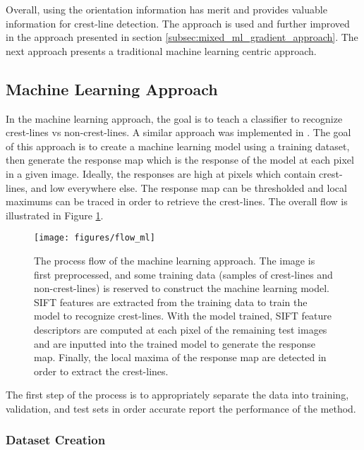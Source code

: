 Overall, using the orientation information has merit and provides valuable information for crest-line detection. The approach is used and further improved in the approach presented in section \ref{subsec:mixed_ml_gradient_approach}. The next approach presents a traditional machine learning centric approach.



\subsection{Machine Learning Approach} \label{subsec:machine_learning_approach}

In the machine learning approach, the goal is to teach a classifier to recognize crest-lines vs non-crest-lines. A similar approach was implemented in \cite{2006_automated_classification_landform_elements,2007_Machine_Learning_tools_automatic_mapping_mars,2013_sar_image_automated_detection_dune_area,BandeiraMarques,2011_neural_network_based_dunal_landform_mapping,vaz_object_based_dune_analysis}. The goal of this approach is to create a machine learning model using a training dataset, then generate the response map which is the response of the model at each pixel in a given image. Ideally, the responses are high at pixels which contain crest-lines, and low everywhere else. The response map can be thresholded and local maximums can be traced in order to retrieve the crest-lines. The overall flow is illustrated in Figure \ref{fig:flow_ml}.

\begin{figure}[H]
	\centering
	\texttt{[image: figures/flow\_ml]}
	\caption{The process flow of the machine learning approach. The image is first preprocessed, and some training data (samples of crest-lines and non-crest-lines) is reserved to construct the machine learning model. SIFT features are extracted from the training data to train the model to recognize crest-lines. With the model trained, SIFT feature descriptors are computed at each pixel of the remaining test images and are inputted into the trained model to generate the response map. Finally, the local maxima of the response map are detected in order to extract the crest-lines. }
	\label{fig:flow_ml}
\end{figure}

The first step of the process is to appropriately separate the data into training, validation, and test sets in order accurate report the performance of the method. 

\subsubsection{Dataset Creation} \label{subsubsec:dataset_creation}

